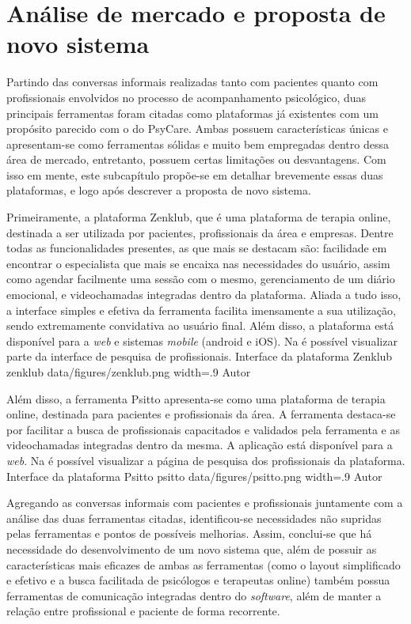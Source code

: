 \section{Análise de mercado e proposta de novo sistema}
\label{sec:analise}

Partindo das conversas informais realizadas tanto com pacientes quanto com profissionais envolvidos no processo de acompanhamento psicológico, duas principais ferramentas foram citadas como plataformas já existentes com um propósito parecido com o do PsyCare. Ambas possuem características únicas e apresentam-se como ferramentas sólidas e muito bem empregadas dentro dessa área de mercado, entretanto, possuem certas limitações ou desvantagens. Com isso em mente, este subcapítulo propõe-se em detalhar brevemente essas duas plataformas, e logo após descrever a proposta de novo sistema.

Primeiramente, a plataforma Zenklub, que é uma plataforma de terapia online, destinada a ser utilizada por pacientes, profissionais da área e empresas. Dentre todas as funcionalidades presentes, as que mais se destacam são: facilidade em encontrar o especialista que mais se encaixa nas necessidades do usuário, assim como agendar facilmente uma sessão com o mesmo, gerenciamento de um diário emocional, e videochamadas integradas dentro da plataforma. Aliada a tudo isso, a interface simples e efetiva da ferramenta facilita imensamente a sua utilização, sendo extremamente convidativa ao usuário final. Além disso, a plataforma está disponível para a \textit{web} e sistemas \textit{mobile} (android e iOS). Na  é possível visualizar parte da interface de pesquisa de profissionais.
\image
    {Interface da plataforma Zenklub}
    {zenklub}
    {data/figures/zenklub.png}
    {width=.9\textwidth}
    {Autor}

Além disso, a ferramenta Psitto apresenta-se como uma plataforma de terapia online, destinada para pacientes e profissionais da área. A ferramenta destaca-se por facilitar a busca de profissionais capacitados e validados pela ferramenta e as videochamadas integradas dentro da mesma. A aplicação está disponível para a \textit{web}. Na  é possível visualizar a página de pesquisa dos profissionais da plataforma.
\image
    {Interface da plataforma Psitto}
    {psitto}
    {data/figures/psitto.png}
    {width=.9\textwidth}
    {Autor}

Agregando as conversas informais com pacientes e profissionais juntamente com a análise das duas ferramentas citadas, identificou-se necessidades não supridas pelas ferramentas e pontos de possíveis melhorias. Assim, conclui-se que há necessidade do desenvolvimento de um novo sistema que, além de possuir as características mais eficazes de ambas as ferramentas (como o layout simplificado e efetivo e a busca facilitada de psicólogos e terapeutas online) também possua ferramentas de comunicação integradas dentro do \textit{software}, além de manter a relação entre profissional e paciente de forma recorrente. 

